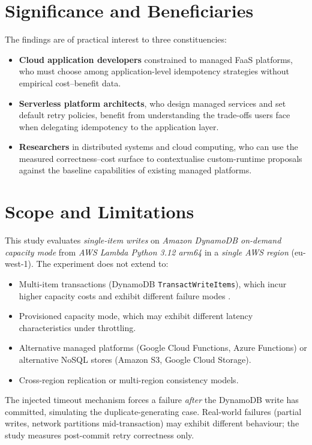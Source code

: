 \section{Significance and Beneficiaries}

The findings are of practical interest to three constituencies:

\begin{itemize}
    \item \textbf{Cloud application developers} constrained to managed FaaS platforms, who must choose among application-level idempotency strategies without empirical cost--benefit data.
    \item \textbf{Serverless platform architects}, who design managed services and set default retry policies, benefit from understanding the trade-offs users face when delegating idempotency to the application layer.
    \item \textbf{Researchers} in distributed systems and cloud computing, who can use the measured correctness--cost surface to contextualise custom-runtime proposals against the baseline capabilities of existing managed platforms.
\end{itemize}

\section{Scope and Limitations}

This study evaluates \textit{single-item writes} on \textit{Amazon DynamoDB on-demand capacity mode} from \textit{AWS Lambda Python 3.12 arm64} in a \textit{single AWS region} (eu-west-1). The experiment does not extend to:

\begin{itemize}
    \item Multi-item transactions (DynamoDB \texttt{TransactWriteItems}), which incur higher capacity costs and exhibit different failure modes \citep{Idziorek2023DynamoDBTx}.
    \item Provisioned capacity mode, which may exhibit different latency characteristics under throttling.
    \item Alternative managed platforms (Google Cloud Functions, Azure Functions) or alternative NoSQL stores (Amazon S3, Google Cloud Storage).
    \item Cross-region replication or multi-region consistency models.
\end{itemize}

The injected timeout mechanism forces a failure \textit{after} the DynamoDB write has committed, simulating the duplicate-generating case. Real-world failures (partial writes, network partitions mid-transaction) may exhibit different behaviour; the study measures post-commit retry correctness only.

